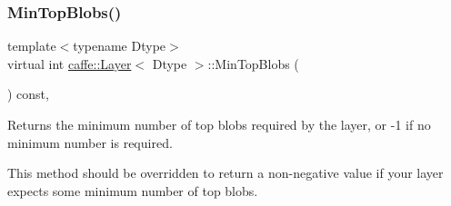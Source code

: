 \mbox{\label{classcaffe_1_1_layer_ab9e4c8d642e413948b131d851a8462a4}} 
\subsubsection{\texorpdfstring{Min\+Top\+Blobs()}{MinTopBlobs()}\hspace{0.1cm}{\footnotesize\ttfamily [2/2]}}
{\footnotesize\ttfamily template$<$typename Dtype$>$ \\
virtual int \mbox{\hyperlink{classcaffe_1_1_layer}{caffe\+::\+Layer}}$<$ Dtype $>$\+::Min\+Top\+Blobs (\begin{DoxyParamCaption}{ }\end{DoxyParamCaption}) const\hspace{0.3cm}{\ttfamily [inline]}, {\ttfamily [virtual]}}



Returns the minimum number of top blobs required by the layer, or -\/1 if no minimum number is required. 

This method should be overridden to return a non-\/negative value if your layer expects some minimum number of top blobs. 


